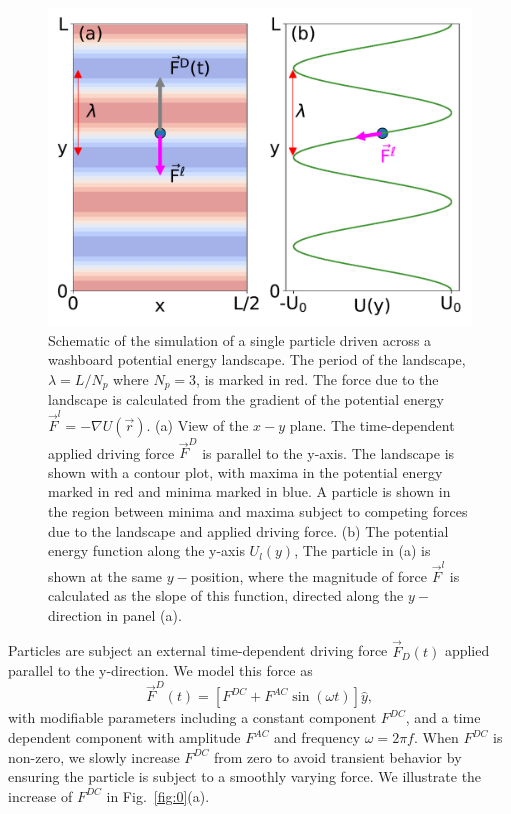 \documentclass[twocolumn,preprintnumbers,amsmath,amssymb,aps,prx]{revtex4}
\begin{document}
\begin{center}
\begin{figure}[h!]
\centering
\includegraphics[width=\columnwidth]{landscape.pdf}
\caption{
  Schematic of the simulation
  of a single particle
  driven across a washboard potential
  energy landscape.
  The period of the landscape, $\lambda = L/N_p$ 
  where $N_p = 3$, is marked in red.
  The force due to the landscape %
  is calculated from the gradient of the potential
  energy 
  $\vec{F}^l = -\nabla U(\vec{r})$.
  (a) View of the $x-y$ plane. %
  The time-dependent applied driving force $\vec{F}^D$
  is parallel to the y-axis.
  The landscape is shown with a contour plot,
  with maxima in the potential energy marked in red
  and minima marked in blue.
  A particle is shown in the region between minima and maxima
  subject to competing forces due to the landscape and applied driving force.
  (b) The potential energy function
  along the y-axis $U_l(y)$,
  The particle in (a) is shown at the same $y-$position,
  where the magnitude of force $\vec{F}^l$ is calculated as the slope of this function,
  directed along the $y-$direction in panel (a).
  }
\label{fig:landscape0}
\end{figure}
\end{center}

 
 Particles are subject an external time-dependent driving force
$\vec{F}_{D}(t)$
applied parallel to the y-direction.
We model this force as
\begin{equation}
  \vec{F}^{D}(t) = [F^{DC} + F^{AC} \sin(\omega t)] \hat{y},
    \label{eq:drive}
\end{equation}
with modifiable parameters including
a constant component $F^{DC}$,
and a time dependent component with amplitude $F^{AC}$
and frequency $\omega = 2 \pi f$.
When $F^{DC}$ is non-zero,  
we slowly increase 
$F^{DC}$ from zero
to avoid transient behavior
by ensuring the particle is subject to a smoothly varying force.
We illustrate the increase
of $F^{DC}$ in Fig.~\ref{fig:0}(a).
\end{document}
